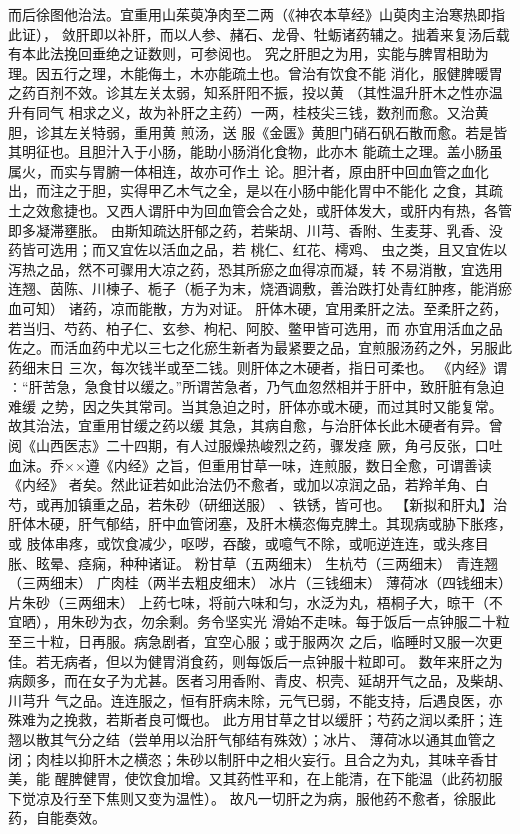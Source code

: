\documentclass[a4paper,12pt,UTF8,twoside]{ctexbook}
\begin{document}
而后徐图他治法。宜重用山茱萸净肉至二两（《神农本草经》山萸肉主治寒热即指此证）， 
敛肝即以补肝，而以人参、赭石、龙骨、牡蛎诸药辅之。拙着来复汤后载有本此法挽回垂绝之证数则，可参阅也。 
究之肝胆之为用，实能与脾胃相助为理。因五行之理，木能侮土，木亦能疏土也。曾治有饮食不能 
消化，服健脾暖胃之药百剂不效。诊其左关太弱，知系肝阳不振，投以黄 （其性温升肝木之性亦温升有同气 
相求之义，故为补肝之主药）一两，桂枝尖三钱，数剂而愈。又治黄胆，诊其左关特弱，重用黄 煎汤，送 
服《金匮》黄胆门硝石矾石散而愈。若是皆其明征也。且胆汁入于小肠，能助小肠消化食物，此亦木 
能疏土之理。盖小肠虽属火，而实与胃腑一体相连，故亦可作土 
论。胆汁者，原由肝中回血管之血化出，而注之于胆，实得甲乙木气之全，是以在小肠中能化胃中不能化 
之食，其疏土之效愈捷也。又西人谓肝中为回血管会合之处，或肝体发大，或肝内有热，各管即多凝滞壅胀。 
由斯知疏达肝郁之药，若柴胡、川芎、香附、生麦芽、乳香、没药皆可选用；而又宜佐以活血之品，若 
桃仁、红花、樗鸡、 虫之类，且又宜佐以泻热之品，然不可骤用大凉之药，恐其所瘀之血得凉而凝，转 
不易消散，宜选用连翘、茵陈、川楝子、栀子（栀子为末，烧酒调敷，善治跌打处青红肿疼，能消瘀血可知） 
诸药，凉而能散，方为对证。 
肝体木硬，宜用柔肝之法。至柔肝之药，若当归、芍药、柏子仁、玄参、枸杞、阿胶、鳖甲皆可选用，而 
亦宜用活血之品佐之。而活血药中尤以三七之化瘀生新者为最紧要之品，宜煎服汤药之外，另服此药细末日 
三次，每次钱半或至二钱。则肝体之木硬者，指日可柔也。 
《内经》谓∶“肝苦急，急食甘以缓之。”所谓苦急者，乃气血忽然相并于肝中，致肝脏有急迫难缓 
之势，因之失其常司。当其急迫之时，肝体亦或木硬，而过其时又能复常。故其治法，宜重用甘缓之药以缓 
其急，其病自愈，与治肝体长此木硬者有异。曾阅《山西医志》二十四期，有人过服燥热峻烈之药，骤发痉 
厥，角弓反张，口吐血沫。乔××遵《内经》之旨，但重用甘草一味，连煎服，数日全愈，可谓善读《内经》 
者矣。然此证若如此治法仍不愈者，或加以凉润之品，若羚羊角、白芍，或再加镇重之品，若朱砂（研细送服） 
、铁锈，皆可也。 
【新拟和肝丸】治肝体木硬，肝气郁结，肝中血管闭塞，及肝木横恣侮克脾土。其现病或胁下胀疼，或 
肢体串疼，或饮食减少，呕哕，吞酸，或噫气不除，或呃逆连连，或头疼目胀、眩晕、痉痫，种种诸证。 
粉甘草（五两细末） 生杭芍（三两细末） 青连翘（三两细末） 广肉桂（两半去粗皮细末） 
冰片（三钱细末） 薄荷冰（四钱细末） 片朱砂（三两细末） 
上药七味，将前六味和匀，水泛为丸，梧桐子大，晾干（不宜晒），用朱砂为衣，勿余剩。务令坚实光 
滑始不走味。每于饭后一点钟服二十粒至三十粒，日再服。病急剧者，宜空心服；或于服两次 
之后，临睡时又服一次更佳。若无病者，但以为健胃消食药，则每饭后一点钟服十粒即可。 
数年来肝之为病颇多，而在女子为尤甚。医者习用香附、青皮、枳壳、延胡开气之品，及柴胡、川芎升 
气之品。连连服之，恒有肝病未除，元气已弱，不能支持，后遇良医，亦殊难为之挽救，若斯者良可慨也。 
此方用甘草之甘以缓肝；芍药之润以柔肝；连翘以散其气分之结（尝单用以治肝气郁结有殊效）；冰片、 
薄荷冰以通其血管之闭；肉桂以抑肝木之横恣；朱砂以制肝中之相火妄行。且合之为丸，其味辛香甘美，能 
醒脾健胃，使饮食加增。又其药性平和，在上能清，在下能温（此药初服下觉凉及行至下焦则又变为温性）。 
故凡一切肝之为病，服他药不愈者，徐服此药，自能奏效。 
\end{document}
